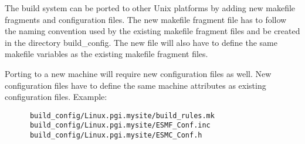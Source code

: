The build system can be ported to other Unix platforms by adding new
makefile fragments and configuration files.  The new makefile fragment 
file has to follow the naming
convention used by the existing makefile fragment files and be created in the
directory build\_config.  The new file will also have to define
the same makefile variables as the existing makefile fragment files.

Porting to a new machine will require new configuration files as well. 
New configuration files have to define the same machine attributes as
existing configuration files. Example:

\begin{verbatim}
      build_config/Linux.pgi.mysite/build_rules.mk
      build_config/Linux.pgi.mysite/ESMF_Conf.inc
      build_config/Linux.pgi.mysite/ESMC_Conf.h
\end{verbatim}

